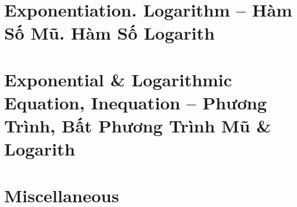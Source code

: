 \documentclass{article}
\begin{document}

\section{Exponentiation. Logarithm -- Hàm Số Mũ. Hàm Số Logarith}


\section{Exponential \& Logarithmic Equation, Inequation -- Phương Trình, Bất Phương Trình Mũ \& Logarith}


\section{Miscellaneous}


\printbibliography[heading=bibintoc]
	
\end{document}
